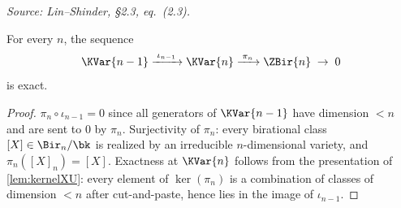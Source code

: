 \begin{lemma}
  \label{lem:exact-seq}
  \textit{Source: Lin--Shinder, §2.3, eq.\ (2.3).}

  For every \(n\), the sequence
  \[
    \KVar{n-1} \xrightarrow{\;\iota_{n-1}\;} \KVar{n} \xrightarrow{\;\pi_n\;} \ZBir{n} \;\to\; 0
  \]
  is exact.
\end{lemma}
\begin{proof}
  \(\pi_n \circ \iota_{n-1} = 0\) since all generators of \(\KVar{n-1}\) have
  dimension \(< n\) and are sent to \(0\) by \(\pi_n\).  Surjectivity of \(\pi_n\):
  every birational class \([X] \in \Bir_n/\bk\) is realized by an irreducible
  \(n\)-dimensional variety, and \(\pi_n([X]_n) = [X]\).  Exactness at \(\KVar{n}\)
  follows from the presentation of \cref{lem:kernelXU}: every element of
  \(\ker(\pi_n)\) is a combination of classes of dimension \(< n\) after
  cut-and-paste, hence lies in the image of \(\iota_{n-1}\).
\end{proof}

